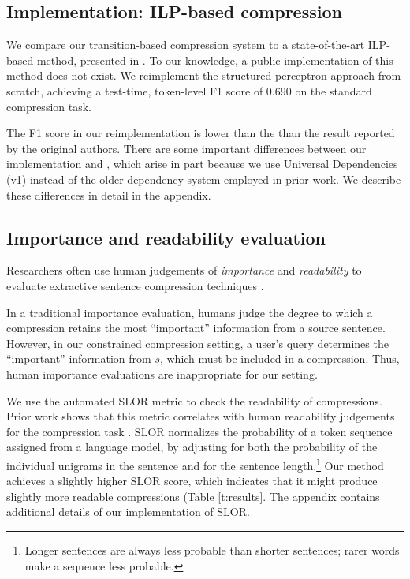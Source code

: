 \documentclass[11pt,a4paper]{article}
\begin{document}
\subsection{Implementation: ILP-based compression}\label{s:ilp}

We compare our transition-based compression system to a state-of-the-art ILP-based method, presented in \citet{filippova2013overcoming}. To our knowledge, a public implementation of this method does not exist. We reimplement the structured perceptron approach from scratch, achieving a test-time, token-level F1 score of  0.690 on the standard compression task. 

The F1 score in our reimplementation is lower than the than the result reported by the original authors. There are some important differences between our implementation and \citet{filippova2013overcoming}, which arise in part because we use Universal Dependencies (v1) instead of the older dependency system employed in prior work. We describe these differences in detail in the appendix.

\subsection{Importance and readability evaluation}\label{s:readabilityinformativeness}

Researchers often use human judgements of \textit{importance} and \textit{readability} to evaluate extractive sentence compression techniques \cite{Knight2000StatisticsBasedS,clarke2008global,filippova2015sentence}. 

In a traditional importance evaluation, humans judge the degree to which a compression retains the most ``important'' information from a source sentence. However, in our constrained compression setting, a user's query determines the ``important'' information from $s$, which must be included in a compression. Thus, human importance evaluations are inappropriate for our setting.
 
We use the automated SLOR metric \cite{lau2015unsupervised} to check the readability of compressions. Prior work shows that this metric correlates with human readability judgements for the compression task \cite{kannConl}. SLOR normalizes the probability of a token sequence assigned from a language model, by adjusting for both the probability of the individual unigrams in the sentence and for the sentence length.\footnote{Longer sentences are always less probable than shorter sentences; rarer words make a sequence less probable.} Our method achieves a slightly higher SLOR score, which indicates that it might produce slightly more readable compressions (Table \ref{t:results}. The appendix contains additional details of our implementation of SLOR. 
\end{document}
